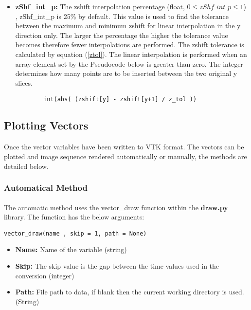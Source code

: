 \documentclass[12pt,a4paper]{article}
\begin{document}
\begin{itemize}
	\item{\textbf{zShf\_int\_p:} The zshift interpolation percentage (float, $0\leq zShf\_int\_p \leq 1 $) , zShf\_int\_p is 25\% by default. This value is used to find the tolerance between the maximum and minimum zshift for linear interpolation in the y direction only. The larger the percentage the higher the tolerance value becomes therefore fewer interpolations are performed. The zshift tolerance is calculated by equation (\ref{ztol}). The linear interpolation is performed when an array element set by the Pseudocode below is greater than zero. The integer determines how many points are to be inserted between the two original y slices.
			
			
	\begin{verbatim}
		int(abs( (zshift[y] - zshift[y+1] / z_tol ))
	\end{verbatim}} 
	
\end{itemize}

\subsection{Plotting Vectors}
\paragraph{}
Once the vector variables have been written to VTK format. The vectors can be plotted and image sequence rendered automatically or manually, the methods are detailed below.


\subsubsection{Automatical Method}
\paragraph{}
The automatic method uses the vector\_draw function within the \textbf{draw.py} library. The function has the below arguments:

\begin{verbatim}
vector_draw(name , skip = 1, path = None)
\end{verbatim}

\begin{itemize}
	\item{\textbf{Name:} Name of the variable (string)}
	\item{\textbf{Skip:} The skip value is the gap between the time values used in the conversion (integer)}
	\item{\textbf{Path:} File path to data, if blank then the current working directory is used. (String)}
\end{itemize}
\end{document}
